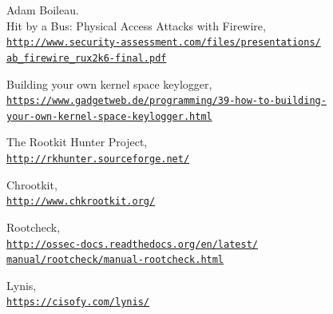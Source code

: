 \documentclass[12pt]{article}
\begin{document}
\begin{thebibliography}{22}
Adam Boileau.\\
Hit by a Bus: Physical Access Attacks with Firewire,
\\\href{http://www.security-assessment.com/files/presentations/ab\_firewire\_rux2k6-final.pdf}{\texttt{http://www.security-assessment.com/files/presentations/
\\ab\_firewire\_rux2k6-final.pdf}}

Building your own kernel space keylogger,
\\\href{https://www.gadgetweb.de/programming/39-how-to-building-your-own-kernel-space-keylogger.html}{\texttt{https://www.gadgetweb.de/programming/39-how-to-building-
\\ your-own-kernel-space-keylogger.html}}

The Rootkit Hunter Project,
\\\href{http://rkhunter.sourceforge.net/}{\texttt{http://rkhunter.sourceforge.net/}}

Chrootkit,
\\\href{http://www.chkrootkit.org/}{\texttt{http://www.chkrootkit.org/}}

Rootcheck,
\\\href{http://ossec-docs.readthedocs.org/en/latest/manual/rootcheck/manual-rootcheck.html}{\texttt{http://ossec-docs.readthedocs.org/en/latest/
\\ manual/rootcheck/manual-rootcheck.html}}

Lynis,
\\\href{https://cisofy.com/lynis/}{\texttt{https://cisofy.com/lynis/}}


\end{thebibliography}
\end{document}
